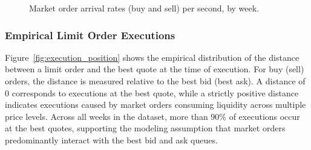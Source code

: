 \documentclass[11pt]{article}
\begin{document}
\begin{figure}[h]
        \centering
    \caption{Market order arrival rates (buy and sell) per second, by week.}
\label{fig: market_arr_tot}
\end{figure}

\subsubsection{Empirical Limit Order Executions}\label{sec: empirical_execution}

Figure~\ref{fig:execution_position} shows the empirical distribution of the distance between a limit order and the best quote at the time of execution. For buy (sell) orders, the distance is measured relative to the best bid (best ask). A distance of $0$ corresponds to executions at the best quote, while a strictly positive distance indicates executions caused by market orders consuming liquidity across multiple price levels. Across all weeks in the dataset, more than $90\%$ of executions occur at the best quotes, supporting the modeling assumption that market orders predominantly interact with the best bid and ask queues.
\end{document}
